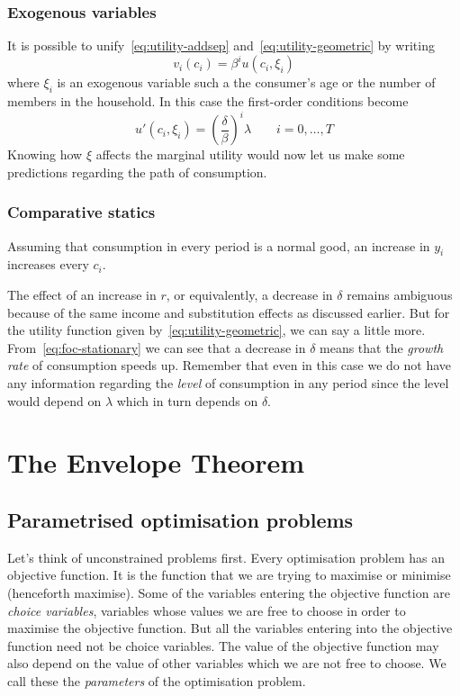 \documentclass[12pt,reqno,openany]{amsbook}
\theoremstyle{plain}
\theoremstyle{definition}
\begin{document}
\subsection{Exogenous variables}
It is possible to unify~\eqref{eq:utility-addsep}
and~\eqref{eq:utility-geometric} by writing
\[v_i(c_i)=\beta^i u(c_i,\xi_i)\]
where $\xi_i$ is an exogenous variable such a the consumer's age or
the number of members in the household. In this case the first-order
conditions become
\[u'(c_i,\xi_i)=\left(\frac{\delta}{\beta}\right)^i \lambda \qquad
i=0,\ldots,T\]
Knowing how $\xi$ affects the marginal utility would
now let us make some predictions regarding the path of consumption.

\subsection{Comparative statics}
Assuming that consumption in every period is a normal good, an
increase in $y_i$ increases every $c_i$.

The effect of an increase in $r$, or equivalently, a decrease in
$\delta$ remains ambiguous because of the same income and substitution
effects as discussed earlier. But for the utility function given
by~\eqref{eq:utility-geometric}, we can say a little
more. From~\eqref{eq:foc-stationary} we can see that a decrease in
$\delta$ means that the \emph{growth rate} of consumption speeds
up. Remember that even in this case we do not have any information
regarding the \emph{level} of consumption in any period since the
level would depend on $\lambda$ which in turn depends on $\delta$.
\chapter{The Envelope Theorem}
\section{Parametrised optimisation problems}
Let's think of unconstrained problems first. Every optimisation
problem has an objective function. It is the function that we are
trying to maximise or minimise (henceforth maximise). Some of the variables entering the
objective function are \emph{choice variables}, variables whose values
we are free to choose in order to maximise the objective function. But
all the variables entering into the objective function need not be
choice variables. The value of the objective function may also depend
on the value of other variables which we are not free to choose. We
call these the \emph{parameters} of the optimisation problem. 
\end{document}
